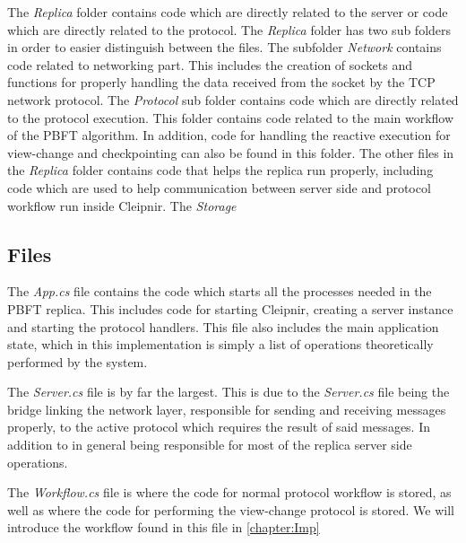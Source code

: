 The \emph{Replica} folder contains code which are directly related to the server or code which are directly related to the protocol. The \emph{Replica} folder has two sub folders in order to easier distinguish between the files. The subfolder \emph{Network} contains code related to networking part. This includes the creation of sockets and functions for properly handling the data received from the socket by the TCP network protocol. 
The \emph{Protocol} sub folder contains code which are directly related to the protocol execution. This folder contains code related to the main workflow of the PBFT algorithm. In addition, code for handling the reactive execution for view-change and checkpointing can also be found in this folder.
The other files in the \emph{Replica} folder contains code that helps the replica run properly, including code which are used to help communication between server side and protocol workflow run inside Cleipnir.
The \emph{Storage} 

\subsection{Files}
The \emph{App.cs} file contains the code which starts all the processes needed in the PBFT replica. This includes code for starting Cleipnir, creating a server instance and starting the protocol handlers. This file also includes the main application state, which in this implementation is simply a list of operations theoretically performed by the system.

The \emph{Server.cs} file is by far the largest. This is due to the \emph{Server.cs} file being the bridge linking the network layer, responsible for sending and receiving messages properly, to the active protocol which requires the result of said messages. In addition to in general being responsible for most of the replica server side operations. 

The \emph{Workflow.cs} file is where the code for normal protocol workflow is stored, as well as where the code for performing the view-change protocol is stored. We will introduce the workflow found in this file in \autoref{chapter:Imp}
%

